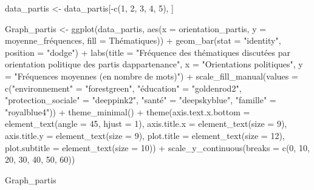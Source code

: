 \documentclass[
  letterpaper,
  DIV=11,
  numbers=noendperiod]{scrartcl}
\newenvironment{Shaded}{\begin{snugshade}}{\end{snugshade}}
\newcommand{\AttributeTok}[1]{\textcolor[rgb]{0.40,0.45,0.13}{#1}}
\newcommand{\DecValTok}[1]{\textcolor[rgb]{0.68,0.00,0.00}{#1}}
\newcommand{\FunctionTok}[1]{\textcolor[rgb]{0.28,0.35,0.67}{#1}}
\newcommand{\NormalTok}[1]{\textcolor[rgb]{0.00,0.23,0.31}{#1}}
\newcommand{\OtherTok}[1]{\textcolor[rgb]{0.00,0.23,0.31}{#1}}
\newcommand{\SpecialCharTok}[1]{\textcolor[rgb]{0.37,0.37,0.37}{#1}}
\newcommand{\StringTok}[1]{\textcolor[rgb]{0.13,0.47,0.30}{#1}}
\begin{document}
\begin{Shaded}
\begin{Highlighting}[]
\NormalTok{data\_partis }\OtherTok{\textless{}{-}}\NormalTok{ data\_partis[}\SpecialCharTok{{-}}\FunctionTok{c}\NormalTok{(}\DecValTok{1}\NormalTok{, }\DecValTok{2}\NormalTok{, }\DecValTok{3}\NormalTok{, }\DecValTok{4}\NormalTok{, }\DecValTok{5}\NormalTok{), ]}

\NormalTok{Graph\_partis }\OtherTok{\textless{}{-}} \FunctionTok{ggplot}\NormalTok{(data\_partis, }\FunctionTok{aes}\NormalTok{(}\AttributeTok{x =}\NormalTok{ orientation\_partis, }\AttributeTok{y =}\NormalTok{ moyenne\_fréquences, }\AttributeTok{fill =}\NormalTok{ Thématiques)) }\SpecialCharTok{+} \FunctionTok{geom\_bar}\NormalTok{(}\AttributeTok{stat =} \StringTok{"identity"}\NormalTok{, }\AttributeTok{position =} \StringTok{"dodge"}\NormalTok{) }\SpecialCharTok{+} \FunctionTok{labs}\NormalTok{(}\AttributeTok{title =} \StringTok{"Fréquence des thématiques discutées par orientation politique des partis d\textquotesingle{}appartenance"}\NormalTok{, }\AttributeTok{x =} \StringTok{"Orientations politiques"}\NormalTok{, }\AttributeTok{y =} \StringTok{"Fréquences moyennes (en nombre de mots)"}\NormalTok{) }\SpecialCharTok{+} \FunctionTok{scale\_fill\_manual}\NormalTok{(}\AttributeTok{values =} \FunctionTok{c}\NormalTok{(}\StringTok{"environnement"} \OtherTok{=} \StringTok{"forestgreen"}\NormalTok{, }\StringTok{"éducation"} \OtherTok{=} \StringTok{"goldenrod2"}\NormalTok{, }\StringTok{"protection\_sociale"} \OtherTok{=} \StringTok{"deeppink2"}\NormalTok{, }\StringTok{"santé"} \OtherTok{=} \StringTok{"deepskyblue"}\NormalTok{, }\StringTok{"famille"} \OtherTok{=} \StringTok{"royalblue4"}\NormalTok{)) }\SpecialCharTok{+} \FunctionTok{theme\_minimal}\NormalTok{() }\SpecialCharTok{+} \FunctionTok{theme}\NormalTok{(}\AttributeTok{axis.text.x.bottom =} \FunctionTok{element\_text}\NormalTok{(}\AttributeTok{angle =} \DecValTok{45}\NormalTok{, }\AttributeTok{hjust =} \DecValTok{1}\NormalTok{), }\AttributeTok{axis.title.x =} \FunctionTok{element\_text}\NormalTok{(}\AttributeTok{size =} \DecValTok{9}\NormalTok{), }\AttributeTok{axis.title.y =} \FunctionTok{element\_text}\NormalTok{(}\AttributeTok{size =} \DecValTok{9}\NormalTok{), }\AttributeTok{plot.title =} \FunctionTok{element\_text}\NormalTok{(}\AttributeTok{size =} \DecValTok{12}\NormalTok{), }\AttributeTok{plot.subtitle =} \FunctionTok{element\_text}\NormalTok{(}\AttributeTok{size =} \DecValTok{10}\NormalTok{)) }\SpecialCharTok{+} \FunctionTok{scale\_y\_continuous}\NormalTok{(}\AttributeTok{breaks =} \FunctionTok{c}\NormalTok{(}\DecValTok{0}\NormalTok{, }\DecValTok{10}\NormalTok{, }\DecValTok{20}\NormalTok{, }\DecValTok{30}\NormalTok{, }\DecValTok{40}\NormalTok{, }\DecValTok{50}\NormalTok{, }\DecValTok{60}\NormalTok{))}

\NormalTok{Graph\_partis}
\end{Highlighting}
\end{Shaded}
\end{document}
